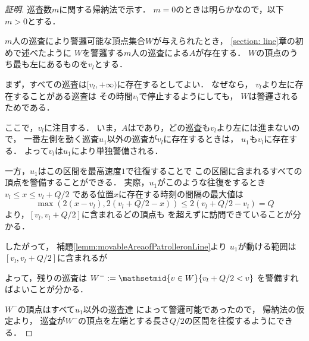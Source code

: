 \begin{proof}[証明]

	\newcommand{\leftmostpoint}{v_l}
	\newcommand{\leftmostpatroller}{u_1}

	巡査数$m$に関する帰納法で示す．
	$m = 0$のときは明らかなので，以下$m > 0$とする．

	$m$人の巡査により警邏可能な頂点集合$W$が与えられたとき，
	\ref{section: line}章の初めで述べたように
	$W$を警邏する$m$人の巡査による{\orderedrun}$A$が存在する．
	$W$の頂点のうち最も左にあるものを$\leftmostpoint$とする．

	まず，すべての巡査は$[\leftmostpoint, +\infty)$に存在するとしてよい．
	なぜなら，
	$\leftmostpoint$より左に存在することがある巡査は
	その時間$\leftmostpoint$で停止するようにしても，
	$W$は警邏されるためである．

	ここで，$\leftmostpoint$に注目する．
	いま，$A$は{\orderedrun}であり，どの巡査も$\leftmostpoint$より左には進まないので，
	一番左側を動く巡査$\leftmostpatroller$以外の巡査が$\leftmostpoint$に存在するときは，
	$\leftmostpatroller$も$\leftmostpoint$に存在する．
	よって$\leftmostpoint$は$\leftmostpatroller$により単独警備される．

	一方，$\leftmostpatroller$はこの区間を最高速度$1$で往復することで
	この区間に含まれるすべての頂点を警備することができる．
	実際，$\leftmostpatroller$がこのような往復をするとき
	$\leftmostpoint \leq x \leq \leftmostpoint + Q/2$
	である位置$x$に存在する時刻の間隔の最大値は
	\[
		\max( 2(x - \leftmostpoint), 2(\leftmostpoint + Q/2 - x) )
		\leq 2(\leftmostpoint + Q/2 - \leftmostpoint) = Q
	\]
	より，$[\leftmostpoint, \leftmostpoint + Q/2]$に含まれるどの頂点も
	{\idletime}を超えずに訪問できていることが分かる．

	したがって，
	補題\ref{lemm:movableAreaofPatrolleronLine}より
	$\leftmostpatroller$が動ける範囲は
	$[\leftmostpoint, \leftmostpoint + Q/2]$に含まれるが
	
	よって，残りの巡査は
	$W ^- := \mathsetmid{ v \in W }{ \leftmostpoint + Q/2 < v }$
	を警備すればよいことが分かる．

	$W ^-$の頂点はすべて$\leftmostpatroller$以外の巡査達
	によって警邏可能であったので，
	帰納法の仮定より，
	巡査が$W ^-$の頂点を左端とする長さ$Q / 2$の区間を往復するようにできる．
\end{proof}

